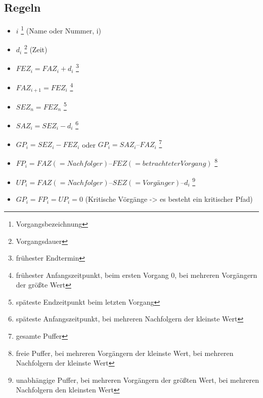 \documentclass[a4paper,12pt]{scrartcl}
\begin{document}
\subsection{Regeln}
\begin{itemize}
\item $i$ \footnote{Vorgangsbezeichnung} (Name oder Nummer, i) 
\item $d_i$ \footnote{Vorgangsdauer} (Zeit)
\item $FEZ_i = FAZ_i + d_i$ \footnote{frühester Endtermin}
\item $FAZ_{i+1} = FEZ_i$ \footnote{frühester Anfangszeitpunkt, beim ersten Vorgang 0, bei mehreren Vorgängern der größte Wert}
\item $SEZ_n = FEZ_n$ \footnote{späteste Endzeitpunkt beim letzten Vorgang}
\item $SAZ_i = SEZ_i - d_i$ \footnote{späteste Anfangszeitpunkt, bei mehreren Nachfolgern der kleinste Wert}
\item $GP_i = SEZ_i - FEZ_i$ oder $GP_i = SAZ_i – FAZ_i$ \footnote{gesamte Puffer}
\item $FP_i = FAZ (= Nachfolger) – FEZ (= betrachteter Vorgang)$ \footnote{freie Puffer, bei mehreren Vorgängern der kleinste Wert, bei mehreren Nachfolgern der kleinste Wert}
\item $UP_i = FAZ (= Nachfolger) – SEZ (= Vorgänger) – d_i$ \footnote{unabhängige Puffer, bei mehreren Vorgängern der größten Wert, bei mehreren Nachfolgern den kleinsten Wert}
\item $GP_i = FP_i = UP_i = 0$ (Kritische Vörgänge -> es besteht ein kritischer Pfad)

\end{itemize}
\end{document}
